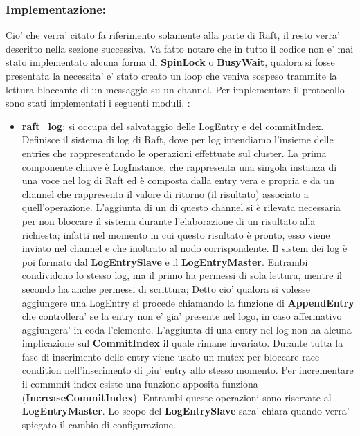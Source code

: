 \subsubsection{Implementazione:\\}
Cio' che verra' citato
fa riferimento solamente alla parte di Raft, il resto verra' descritto nella sezione successiva.
Va fatto notare che in tutto il codice non e' mai stato implementato alcuna forma di 
\textbf{SpinLock} o \textbf{BusyWait}, qualora si fosse presentata la necessita' e' stato
creato un loop che veniva sospeso trammite la lettura bloccante di un messaggio su un channel.
Per implementare il protocollo sono stati implementati i seguenti moduli, :
\begin{itemize}
    \item \textbf{raft\_log}: si occupa del salvataggio delle LogEntry e del commitIndex.
    Definisce il sistema di log di Raft, dove per log intendiamo l'insieme delle entries 
    che rappresentando le operazioni effettuate sul cluster. La prima componente chiave è 
    LogInstance, che 
    rappresenta una singola instanza di una voce nel log di Raft ed è composta dalla entry vera 
    e propria e da un channel che rappresenta il valore di ritorno (il risultato) associato a 
    quell'operazione. L'aggiunta di un 
    di questo channel si è rilevata necessaria per non bloccare il sistema durante l'elaborazione 
    di un risultato alla richiesta; infatti nel momento in cui questo risultato è pronto, esso 
    viene inviato nel channel e che inoltrato al nodo corrispondente.
    Il sistem dei log è poi formato dal \textbf{LogEntrySlave} e il \textbf{LogEntryMaster}. 
    Entrambi condividono 
    lo stesso log, ma il primo ha permessi di sola lettura, mentre il secondo ha anche permessi 
    di scrittura; 
    Detto cio' qualora si volesse aggiungere una LogEntry si procede chiamando la funzione
    di \textbf{AppendEntry} che controllera' se la entry non e' gia' presente nel logo, in 
    caso affermativo aggiungera' in coda l'elemento. L'aggiunta di una entry nel log non ha alcuna
    implicazione sul \textbf{CommitIndex} il quale rimane invariato. Durante 
    tutta la fase di inserimento delle entry viene usato un mutex per bloccare race condition
    nell'inserimento di piu' entry allo stesso momento.
    Per incrementare il commmit index esiste una funzione apposita funziona 
    (\textbf{IncreaseCommitIndex}).
    Entrambi queste operazioni sono riservate al \textbf{LogEntryMaster}.
    Lo scopo del \textbf{LogEntrySlave} sara' chiara quando verra' spiegato il 
    cambio di configurazione.


\end{itemize}
